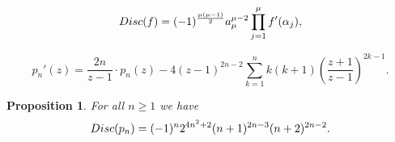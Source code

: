 \documentclass[10pt,a4paper]{amsart}
\newtheorem{proposition}{Proposition}
\begin{document}
\begin{equation}\label{5.18}
{\rm Disc}(f)=(-1)^{\frac{\mu(\mu-1)}{2}}a_{\mu}^{\mu-2}
\prod_{j=1}^{\mu}f'(\alpha_j),
\end{equation}

\begin{equation}\label{5.20}
p_n'(z) = \frac{2n}{z-1}\cdot p_n(z)-4(z-1)^{2n-2}
\sum_{k=1}^n k(k+1)\left(\frac{z+1}{z-1}\right)^{2k-1}.
\end{equation}

\begin{proposition}\label{prop:5.4}
For all $n\geq 1$ we have
\begin{equation}\label{5.19}
{\rm Disc}(p_n) = (-1)^n 2^{4n^2+2}(n+1)^{2n-3}(n+2)^{2n-2}.
\end{equation}
\end{proposition}
\end{document}
